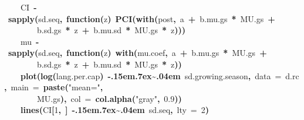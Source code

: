 \documentclass{article}
\makeatletter
\newcommand{\hlnumber}[1]{\textcolor[rgb]{0,0,0}{#1}}%
\newcommand{\hlfunctioncall}[1]{\textcolor[rgb]{.5,0,.33}{\textbf{#1}}}%
\newcommand{\hlstring}[1]{\textcolor[rgb]{.6,.6,1}{#1}}%
\newcommand{\hlkeyword}[1]{\textbf{#1}}%
\newcommand{\hlargument}[1]{\textcolor[rgb]{.69,.25,.02}{#1}}%
\newcommand{\hlformalargs}[1]{\hlargument{#1}}%
\newcommand{\hlassignement}[1]{\textbf{#1}}%
\newcommand{\hlsymbol}[1]{#1}%
\def\urltilda{\kern -.15em\lower .7ex\hbox{\~{}}\kern .04em}%
\newcommand{\hlstd}[1]{\textcolor[rgb]{0,0,0}{#1}}%
\newenvironment{kframe}{%
 \def\FrameCommand##1{\hskip\@totalleftmargin \hskip-\fboxsep
 \colorbox{shadecolor}{##1}\hskip-\fboxsep
     \hskip-\linewidth \hskip-\@totalleftmargin \hskip\columnwidth}%
 \MakeFramed {\advance\hsize-\width
   \@totalleftmargin\z@ \linewidth\hsize
   \@setminipage}}%
 {\par\unskip\endMakeFramed}
\newenvironment{knitrout}{}{} %
\makeatother
\begin{document}
\begin{knitrout}
{\begin{kframe}
\begin{flushleft}
\hlstd{}{\ }{\ }{\ }{\ }\hlsymbol{CI}{\ }\hlassignement{\usebox{\hlnormalsizeboxlessthan}-}{\ }\hlfunctioncall{sapply}\hlkeyword{(}\hlsymbol{sd.seq}\hlkeyword{,}{\ }\hlkeyword{function}\hlkeyword{(}\hlformalargs{z}\hlkeyword{)}{\ }\hlfunctioncall{PCI}\hlkeyword{(}\hlfunctioncall{with}\hlkeyword{(}\hlsymbol{post}\hlkeyword{,}{\ }\hlsymbol{a}{\ }\hlkeyword{+}{\ }\hlsymbol{b.mu.gs}{\ }\hlkeyword{*}{\ }\hlsymbol{MU.gs}{\ }\hlkeyword{+}\hspace*{\fill}\\
\hlstd{}{\ }{\ }{\ }{\ }{\ }{\ }{\ }{\ }\hlsymbol{b.sd.gs}{\ }\hlkeyword{*}{\ }\hlsymbol{z}{\ }\hlkeyword{+}{\ }\hlsymbol{b.mu.sd}{\ }\hlkeyword{*}{\ }\hlsymbol{MU.gs}{\ }\hlkeyword{*}{\ }\hlsymbol{z}\hlkeyword{)}\hlkeyword{)}\hlkeyword{)}\hspace*{\fill}\\
\hlstd{}{\ }{\ }{\ }{\ }\hlsymbol{mu}{\ }\hlassignement{\usebox{\hlnormalsizeboxlessthan}-}{\ }\hlfunctioncall{sapply}\hlkeyword{(}\hlsymbol{sd.seq}\hlkeyword{,}{\ }\hlkeyword{function}\hlkeyword{(}\hlformalargs{z}\hlkeyword{)}{\ }\hlfunctioncall{with}\hlkeyword{(}\hlsymbol{mu.coef}\hlkeyword{,}{\ }\hlsymbol{a}{\ }\hlkeyword{+}{\ }\hlsymbol{b.mu.gs}{\ }\hlkeyword{*}{\ }\hlsymbol{MU.gs}{\ }\hlkeyword{+}\hspace*{\fill}\\
\hlstd{}{\ }{\ }{\ }{\ }{\ }{\ }{\ }{\ }\hlsymbol{b.sd.gs}{\ }\hlkeyword{*}{\ }\hlsymbol{z}{\ }\hlkeyword{+}{\ }\hlsymbol{b.mu.sd}{\ }\hlkeyword{*}{\ }\hlsymbol{MU.gs}{\ }\hlkeyword{*}{\ }\hlsymbol{z}\hlkeyword{)}\hlkeyword{)}\hspace*{\fill}\\
\hlstd{}{\ }{\ }{\ }{\ }\hlfunctioncall{plot}\hlkeyword{(}\hlfunctioncall{log}\hlkeyword{(}\hlsymbol{lang.per.cap}\hlkeyword{)}{\ }\hlkeyword{\urltilda{}}{\ }\hlsymbol{sd.growing.season}\hlkeyword{,}{\ }\hlargument{data}{\ }\hlargument{=}{\ }\hlsymbol{d.rc}\hlkeyword{,}{\ }\hlargument{main}{\ }\hlargument{=}{\ }\hlfunctioncall{paste}\hlkeyword{(}\hlstring{"mean="}\hlkeyword{,}\hspace*{\fill}\\
\hlstd{}{\ }{\ }{\ }{\ }{\ }{\ }{\ }{\ }\hlsymbol{MU.gs}\hlkeyword{)}\hlkeyword{,}{\ }\hlargument{col}{\ }\hlargument{=}{\ }\hlfunctioncall{col.alpha}\hlkeyword{(}\hlstring{"gray"}\hlkeyword{,}{\ }\hlnumber{0.9}\hlkeyword{)}\hlkeyword{)}\hspace*{\fill}\\
\hlstd{}{\ }{\ }{\ }{\ }\hlfunctioncall{lines}\hlkeyword{(}\hlsymbol{CI}\hlkeyword{[}\hlnumber{1}\hlkeyword{,}{\ }\hlkeyword{]}{\ }\hlkeyword{\urltilda{}}{\ }\hlsymbol{sd.seq}\hlkeyword{,}{\ }\hlargument{lty}{\ }\hlargument{=}{\ }\hlnumber{2}\hlkeyword{)}\hspace*{\fill}\\

\end{flushleft}
\end{kframe}}
\end{knitrout}
\end{document}
